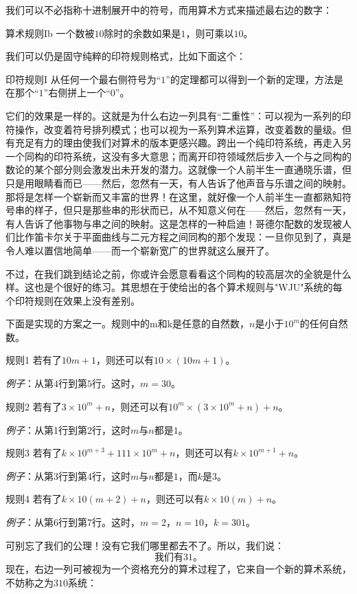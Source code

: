 我们可以不必指称十进制展开中的符号，而用算术方式来描述最右边的数字：
\begin{thm}{算术规则Ib}
一个数被$10$除时的余数如果是$1$，则可乘以$10$。
\end{thm}

我们可以仍是固守纯粹的印符规则格式，比如下面这个：
\begin{thm}{印符规则I}
从任何一个最右侧符号为“$1$”的定理都可以得到一个新的定理，方法是在那个“$1$”右侧拼上一个“$0$”。
\end{thm}
它们的效果是一样的。这就是为什么右边一列具有“二重性”：可以视为一系列的印符操作，改变着符号排列模式；也可以视为一系列算术运算，改变着数的量级。但有充足有力的理由使我们对算术的版本更感兴趣。跨出一个纯印符系统，再走入另一个同构的印符系统，这没有多大意思；而离开印符领域然后步入一个与之同构的数论的某个部分则会激发出未开发的潜力。这就像一个人前半生一直通晓乐谱，但只是用眼睛看而已——然后，忽然有一天，有人告诉了他声音与乐谱之间的映射。那将是怎样一个崭新而又丰富的世界！在这里，就好像一个人前半生一直都熟知符号串的样子，但只是那些串的形状而已，从不知意义何在——然后，忽然有一天，有人告诉了他事物与串之间的映射。这是怎样的一种启迪！哥德尔配数的发现被人们比作笛卡尔关于平面曲线与二元方程之间同构的那个发现：一旦你见到了，真是令人难以置信地简单——而一个崭新宽广的世界就这么展开了。

不过，在我们跳到结论之前，你或许会愿意看看这个同构的较高层次的全貌是什么样。这也是个很好的练习。其思想在于使给出的各个算术规则与"WJU"系统的每个印符规则在效果上没有差别。

下面是实现的方案之一。规则中的m和k是任意的自然数，$n$是小于$10^m$的任何自然数。

\begin{thm}{规则1}
若有了$10m+1$，则还可以有$10\times(10m+1)$。

\emph{例子}：从第$4$行到第$5$行。这时，$m=30$。

\item[规则2]
若有了$3\times10^m+n$，则还可以有$10^m\times(3\times10^m+n)+n$。

\emph{例子}：从第1行到第2行，这时$m$与$n$都是$1$。

\item[规则3]
若有了$k\times10^{m+3}+111\times10^m+n$，则还可以有$k\times10^{m+1}+n$。

\emph{例子}：从第3行到第4行，这时$m$与$n$都是$1$，而$k$是$3$。

\item[规则4]
若有了$k\times10(m+2)+n$，则还可以有$k\times10(m)+n$。

\emph{例子}：从第6行到第7行。这时，$m=2$，$n=10$，$k=301$。
\end{thm}
可别忘了我们的公理！没有它我们哪里都去不了。所以，我们说：
\[
\text{我们有$31$。}
\]
现在，右边一列可被视为一个资格充分的算术过程了，它来自一个新的算术系统，不妨称之为$310$系统：

